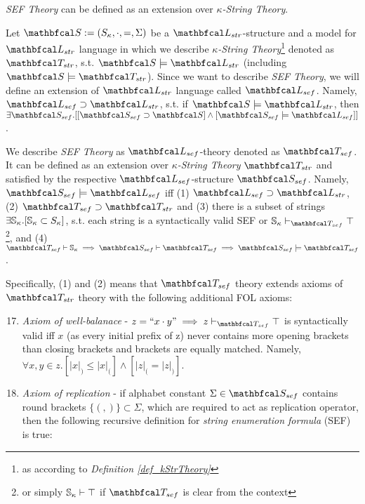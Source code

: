 \textit{SEF Theory} can be defined as an extension over \textit{$\kappa$-String Theory}.

\begin{definition}\label{def_seftheor}
  Let $\LsS := (S_{\kappa},\cdot,=,\Sigma)$ be a $\lsign_{str}$-structure and a model for $\lsign_{str}$ language in which we describe \textit{$\kappa$-String Theory}\footnote{as according to \textit{Definition \ref{def_kStrTheory}}} denoted as $\LsT_{str}$, s.t. $\LsS \models \lsign_{str}$ (including $\LsS \models \LsT_{str}$). Since we want to describe \textit{SEF Theory}, we will define an extension of $\lsign_{str}$ language called $\lsign_{sef}$. Namely, $\lsign_{sef} \supset \lsign_{str}$, s.t. if $\LsS \models \lsign_{str}$, then $\exists \LsS_{sef} . [[\LsS_{sef} \supset \LsS] \land [\LsS_{sef} \models \lsign_{sef}]]$.
  
  We describe \textit{SEF Theory} as $\lsign_{sef}$-theory denoted as  $\LsT_{sef}$. It can be defined as an extension over \textit{$\kappa$-String Theory} $\LsT_{str}$ and satisfied by the respective $\lsign_{sef}$-structure $\LsS_{sef}$. Namely, $\LsS_{sef} \models \lsign_{sef}$ iff (1) $\lsign_{sef} \supset \lsign_{str}$, (2) $\LsT_{sef} \supset \LsT_{str}$ and (3) there is a subset of strings $\exists \mathbb{S}_{\kappa} . [\mathbb{S}_{\kappa} \subset S_{\kappa}]$, s.t. each string is a syntactically valid SEF or $\vsef_{\kappa} \vdash_{\LsT_{sef}} \top$\footnote{or simply $\mathbb{S}_{\kappa} \vdash \top$ if $\LsT_{sef}$ is clear from the context}, and (4) $\LsT_{sef} \vdash \vsef_{\kappa} \implies \LsS_{sef} \vdash \LsT_{sef} \implies \LsS_{sef} \models \LsT_{sef}$.

  Specifically, (1) and (2) means that $\LsT_{sef}$ theory extends axioms of $\LsT_{str}$ theory with the following additional FOL axioms:

  \begin{enumerate}
    \setcounter{enumi}{16}
    \item \textit{Axiom of well-balanace} - $z = \bos x \cdot y\eos \implies z \vdash_{\LsT_{sef}} \top$ is syntactically valid iff $x$ (as every initial prefix of z) never contains more opening brackets than closing brackets and brackets are equally matched. Namely, $\forall x,y \in z.[|x|_{)} \leq |x|_{(}] \land [|z|_{(} = |z|_{)}]$.
    
    \item \textit{Axiom of replication} - if alphabet constant $\Sigma \in \LsS_{sef}$ contains round brackets $\{(,)\} \subset \Sigma$, which are required to act as replication operator, then the following recursive definition for \textit{string enumeration formula} (SEF) is true:
  

\end{enumerate}
\end{definition}

